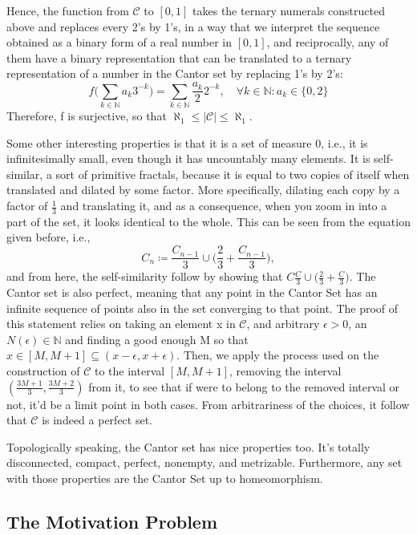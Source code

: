 \documentclass[a4paper]{article}
\theoremstyle{plain}
\theoremstyle{definition}
\begin{document}
 Hence, the function from $\mathcal{C}$ to $[0, 1]$ takes the ternary numerals constructed above and replaces every 2's by 1's, in a way 
 that we interpret the sequence obtained as a binary form of a real number in $[0, 1]$, and reciprocally, any of them have a binary  
 representation that can be translated to a ternary representation of a number in the Cantor set by replacing 1's by 2's:  
   $$ 
   f\biggl(\sum\limits_{k\in \mathbb{N}}^{}a_{k}3^{-k}\biggr) = \sum\limits_{k\in \mathbb{N}}^{}\frac{a_{k}}{2}2^{-k},\quad \forall k\in \mathbb{N}: a_{k}\in \{0, 2\} 
   $$ 
   Therefore, f is surjective, so that $\aleph_{1} \leq{|\mathcal{C}|} \leq{\aleph_{1}.}$ 
  
   Some other interesting properties is that it is a set of measure 0, i.e., it is infinitesimally small, even though it has uncountably many 
 elements. It is self-similar, a sort of primitive fractals, because it is equal to two copies of itself when translated and dilated by some factor.  
 More specifically, dilating each copy by a factor of $\frac{1}{3}$ and translating it, and as a consequence, when you zoom in into a  
 part of the set, it looks identical to the whole. This can be seen from the equation given before, i.e.,  
   $$ 
     C_{n}\coloneqq\displaystyle \frac{C_{n-1}}{3}\cup\biggl(\frac{2}{3}+\frac{C_{n-1}}{3}\biggr), 
   $$ 
   and from here, the self-similarity follow by showing that $C\displaystyle \frac{C}{3}\cup\biggl(\frac{2}{3}+\frac{C}{3}\biggr)$. 
 The Cantor set is also perfect, meaning that any point in the Cantor Set has an infinite sequence of points also in the set converging to that point. 
 The proof of this statement relies on taking an element x in $\mathcal{C}$, and arbitrary $\epsilon > 0$, an $N(\epsilon)\in \mathbb{N}$ and finding a good enough M  
 so that $x\in[M, M+1]\subseteq{(x-\epsilon, x+\epsilon)}$. Then, we apply the process used on the construction of $\mathcal{C}$ to 
 the interval $[M, M+1]$, removing the interval $(\frac{3M+1}{3}, \frac{3M+2}{3})$ from it, to see that if were to belong to the removed  
 interval or not, it'd be a limit point in both cases. From arbitrariness of the choices, it follow that $\mathcal{C}$ is indeed a perfect set. 
  
   Topologically speaking, the Cantor set has nice properties too. It's totally disconnected, compact, perfect, nonempty, and metrizable. 
 Furthermore, any set with those properties are the Cantor Set up to homeomorphism. 
 \subsection{The Motivation Problem} 
\end{document}
